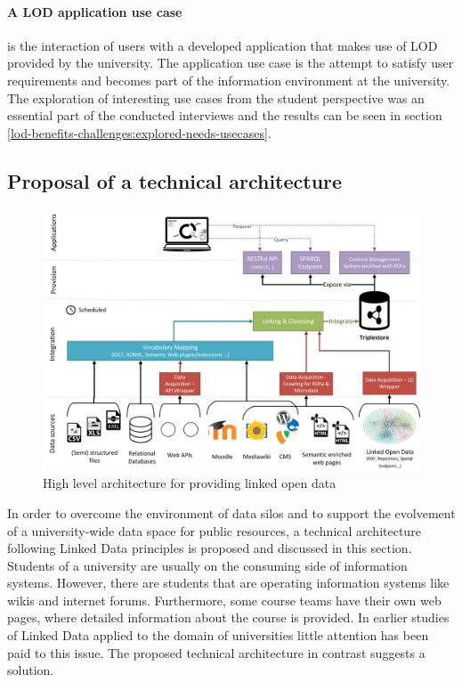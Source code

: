 \documentclass{article}
\begin{document}
\paragraph{A LOD application use case} 
\label{technical-architecture-challenges:lod-effort:use-case}
is the interaction of users with a developed application that makes use of LOD provided by the university. The application use case is the attempt to satisfy user requirements and becomes part of the information environment at the university. The exploration of interesting use cases from the student perspective was an essential part of the conducted interviews and the results can be seen in section \ref{lod-benefits-challenges:explored-needs-usecases}.

\subsection{Proposal of a technical architecture}
\label{technical-architecture-challenges:proposal}

\begin{figure}[t]
\centering \includegraphics*[width=1.0\columnwidth]{images/technical-architecture/lod_technical_architecture.png}
\caption{High level architecture for providing linked open data}
\label{fig:tac-high-level-architecture}
\end{figure}

In order to overcome the environment of data silos and to support the evolvement of a university-wide data space for public resources, a technical architecture following Linked Data principles is proposed and discussed in this section. Students of a university are usually on the consuming side of information systems. However, there are students that are operating information systems like wikis and internet forums. Furthermore, some course teams have their own web pages, where detailed information about the course is provided. In earlier studies of Linked Data applied to the domain of universities little attention has been paid to this issue. The proposed technical architecture in contrast suggests a solution.
\end{document}
